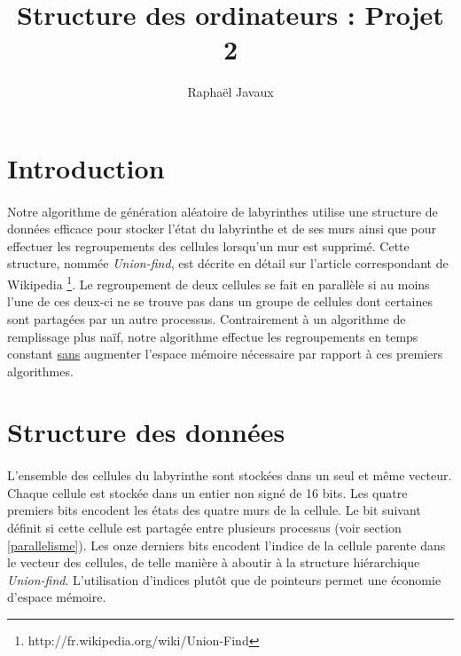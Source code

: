 \documentclass[a4paper,french]{article}
\title{Structure des ordinateurs : Projet 2}
\author{Raphaël Javaux}
\date{}
\begin{document}
\maketitle

\section{Introduction}

    \paragraph{} Notre algorithme de génération aléatoire de labyrinthes utilise
une structure de données efficace pour stocker l'état du labyrinthe et de ses
murs ainsi que pour effectuer les regroupements des cellules lorsqu'un mur est
supprimé.
    \newline Cette structure, nommée \textit{Union-find}, est décrite en détail
sur l'article correspondant de Wikipedia
\footnote{http://fr.wikipedia.org/wiki/Union-Find}. Le regroupement de deux
cellules se fait en parallèle si au moins l'une de ces deux-ci ne se trouve pas
dans un groupe de cellules dont certaines sont partagées par un autre processus.
    \newline Contrairement à un algorithme de remplissage plus naïf, notre
algorithme effectue les regroupements en temps constant \underline{sans}
augmenter l'espace mémoire nécessaire par rapport à ces premiers algorithmes.

\section{Structure des données}
\label{donnees}

    \paragraph{} L'ensemble des cellules du labyrinthe sont stockées dans un
seul et même vecteur.
    \newline Chaque cellule est stockée dans un entier non signé de 16 bits. Les
quatre premiers bits encodent les états des quatre murs de la cellule. Le bit
suivant définit si cette cellule est partagée entre plusieurs processus (voir
section \ref{parallelisme}). Les onze derniers bits encodent l'indice de la
cellule parente dans le vecteur des cellules, de telle manière à aboutir à la
structure hiérarchique \textit{Union-find}. L'utilisation d'indices plutôt que
de pointeurs permet une économie d'espace mémoire.
\end{document}
